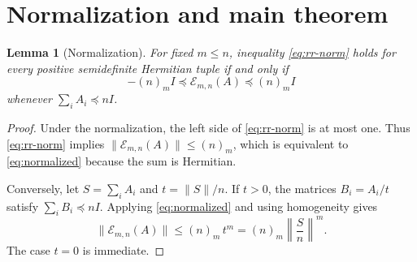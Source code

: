 \documentclass[11pt]{article}
\newtheorem{lemma}[theorem]{Lemma}
\newcommand{\E}{\mathcal E}
\newcommand{\fall}[2]{(#1)_{#2}}
\begin{document}
\section{Normalization and main theorem}\label{sec:statement}

\begin{lemma}[Normalization]\label{lem:normalization}
For fixed \(m\le n\), inequality \eqref{eq:rr-norm} holds for every positive semidefinite Hermitian tuple if and only if
\begin{equation}\label{eq:normalized}
 -\fall nm I\preceq\E_{m,n}(A)\preceq\fall nm I
\end{equation}
whenever \(\sum_iA_i\preceq nI\).
\end{lemma}

\begin{proof}
Under the normalization, the left side of \eqref{eq:rr-norm} is at most one.  Thus \eqref{eq:rr-norm} implies
\(\|\E_{m,n}(A)\|\le\fall nm\), which is equivalent to \eqref{eq:normalized} because the sum is Hermitian.

Conversely, let \(S=\sum_iA_i\) and \(t=\|S\|/n\).  If \(t>0\), the matrices \(B_i=A_i/t\) satisfy \(\sum_iB_i\preceq nI\).  Applying \eqref{eq:normalized} and using homogeneity gives
\[
 \|\E_{m,n}(A)\|\le\fall nm\,t^m
 =\fall nm\left\|\frac{S}{n}\right\|^m.
\]
The case \(t=0\) is immediate.
\end{proof}
\end{document}
